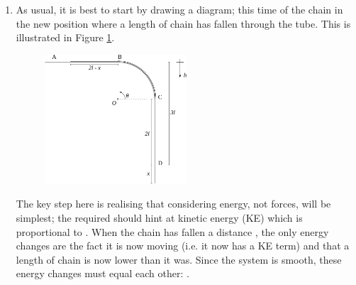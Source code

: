 \begin{problem}
{
}
{}
{\begin{enumerate}
	\item As usual, it is best to start by drawing a diagram; this time of the chain in the new position where a length  of chain has fallen through the tube. This is illustrated in Figure \ref{fig:Dynamics_chain_sliding_labelled}.

\begin{figure}[h!]
\centering
\includegraphics[width=0.5\textwidth]{../../../figures/Dynamics_chain_sliding_labelled.svg}
\caption{}
\label{fig:Dynamics_chain_sliding_labelled}
\end{figure}

The key step here is realising that considering energy, not forces, will be simplest; the  required should hint at kinetic energy (KE) which is proportional to . When the chain has fallen a distance , the only energy changes are the fact it is now moving (i.e. it now has a KE term) and that a length  of chain is now lower than it was. Since the system is smooth, these energy changes must equal each other: .


\end{enumerate}}
\end{problem}
